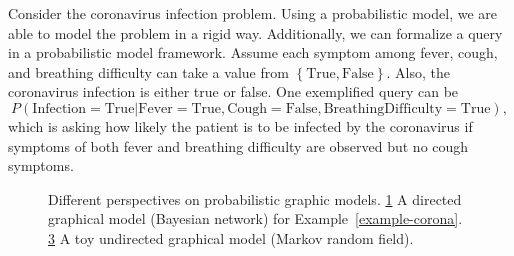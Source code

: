 \begin{example}\label{example-corona}
  Consider the coronavirus infection problem. Using a probabilistic model, we are able to model the problem in a rigid way. Additionally, we can formalize a query in a probabilistic model framework. Assume each symptom among fever, cough, and breathing difficulty can take a value from $\left\{ \mathrm{True}, \mathrm{False} \right\}$. Also, the coronavirus infection is either true or false. One exemplified query can be
  \begin{equation}
    P(\mathrm{Infection} = \mathrm{True} | \mathrm{Fever} = \mathrm{True}, \mathrm{Cough} = \mathrm{False}, \mathrm{Breathing Difficulty}= \mathrm{True}), \nonumber
  \end{equation}
  which is asking how likely the patient is to be infected by the coronavirus if symptoms of both fever and breathing difficulty are observed but no cough symptoms.

\end{example}

\begin{figure}[!t]
  \begin{subfigure}{.4\textwidth}
    \caption{}
    \label{fig:dag-coronavirus}
  \end{subfigure}\hspace{2.5cm}
  \begin{subfigure}{0.3\textwidth}
    \caption{}
    \label{fig:mrf-communication}
  \end{subfigure}
  \caption{Different perspectives on probabilistic graphic models. \ref{fig:dag-coronavirus} A directed graphical model (Bayesian network) for Example~\ref{example-corona}. \ref{fig:mrf-communication} A toy undirected graphical model (Markov random field).}
\end{figure}


